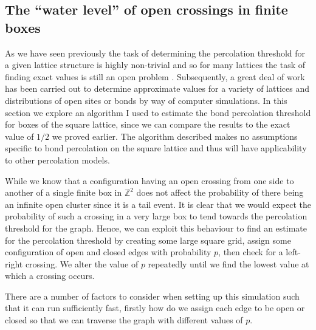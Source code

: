 \documentclass[a4paper,11pt]{article}
\theoremstyle{definition}
\newcommand{\ints}{\mathbb{Z}}
\begin{document}
\subsection{The ``water level'' of open crossings in finite boxes}

As we have seen previously the task of determining the percolation threshold for a given lattice structure is highly non-trivial and so for many lattices the task of finding exact values is still an open problem \cite{StoverThreshold}. Subsequently, a great deal of work has been carried out to determine approximate values for a variety of lattices and distributions of open sites or bonds by way of computer simulations. In this section we explore an algorithm I used to estimate the bond percolation threshold for boxes of the square lattice, since we can compare the results to the exact value of $1/2$ we proved earlier. The algorithm described makes no assumptions specific to bond percolation on the square lattice and thus will have applicability to other percolation models.

While we know that a configuration having an open crossing from one side to another of a single finite box in $\ints^2$ does not affect the probability of there being an infinite open cluster since it is a tail event. It is clear that we would expect the probability of such a crossing in a very large box to tend towards the percolation threshold for the graph. Hence, we can exploit this behaviour to find an estimate for the percolation threshold by creating some large square grid, assign some configuration of open and closed edges with probability $p$, then check for a left-right crossing. We alter the value of $p$ repeatedly until we find the lowest value at which a crossing occurs.

There are a number of factors to consider when setting up this simulation such that it can run sufficiently fast, firstly how do we assign each edge to be open or closed so that we can traverse the graph with different values of $p$.
\end{document}
